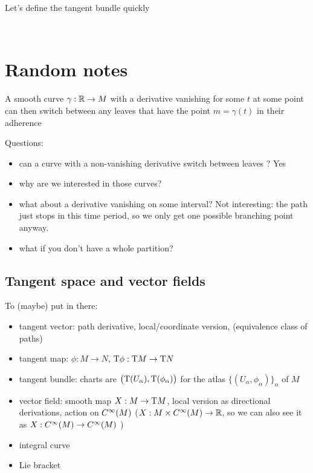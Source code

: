 
	Let's define the tangent bundle quickly


\newpage
~
\newpage

\section{Random notes}

	A smooth curve $\gamma: \mathbb{R} \to M$ with a derivative vanishing for some $t$ at some point can then switch between any leaves that have the point $m = \gamma(t)$ in their adherence

	Questions:
	\begin{itemize}
		\item can a curve with a non-vanishing derivative switch between leaves ? Yes
		\item why are we interested in those curves?
		\item what about a derivative vanishing on some interval? Not interesting: the path just stops in this time period, so we only get one possible branching point anyway.
		\item what if you don't have a whole partition?
	\end{itemize}


	\subsection{Tangent space and vector fields}

		To (maybe) put in there:
		\begin{itemize}
			\item tangent vector: path derivative, local/coordinate version, (equivalence class of paths)
			\item tangent map: $\phi: M \to N$, $\mathrm{T}{\phi}: \mathrm{T}{M} \to \mathrm{T}{N}$
			\item tangent bundle: charts are $\big( \mathrm{T}(U_\alpha), \mathrm{T}(\phi_\alpha) \big)$ for the atlas $\big\{ (U_\alpha, \phi_\alpha) \big\}_\alpha$ of $M$
			\item vector field: smooth map $X: M \to \mathrm{T}{M}$, local version as directional derivations, action on $C^\infty(M)$ ($X: M \times C^\infty(M) \to \mathbb{R}$, so we can also see it as $X: C^\infty(M) \to C^\infty(M)$ )
			\item integral curve
			\item Lie bracket
		\end{itemize}

